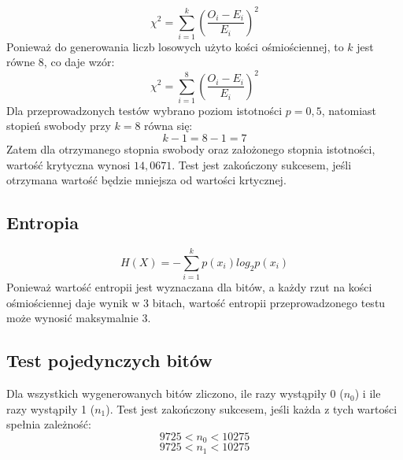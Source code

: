 \begin{displaymath}
    \chi^2 = \sum_{i=1}^{k} \left( \frac{O_i - E_i}{E_i} \right)^2
\end{displaymath}
Ponieważ do generowania liczb losowych użyto kości ośmiościennej, to \begin{math} k \end{math} jest równe 8, co daje wzór:
\begin{displaymath}
    \chi^2 = \sum^{8}_{i=1} \left( \frac{O_i - E_i}{E_i} \right)^2
\end{displaymath}
Dla przeprowadzonych testów wybrano poziom istotności \begin{math} p = 0,5 \end{math}, natomiast stopień swobody 
przy \begin{math} k = 8 \end{math} równa się:
\begin{displaymath}
    k - 1 = 8 - 1 = 7
\end{displaymath}
Zatem dla otrzymanego stopnia swobody oraz założonego stopnia istotności, wartość krytyczna wynosi \begin{math} 14,0671 \end{math}.
Test jest zakończony sukcesem, jeśli otrzymana wartość będzie mniejsza od wartości krtycznej.

\subsection{Entropia}
\begin{displaymath}
    H \left(X\right) = -\sum^k_{i=1} p \left(x_i\right) log_2 p \left(x_i\right)
\end{displaymath}
Ponieważ wartość entropii jest wyznaczana dla bitów, a każdy rzut na kości ośmiościennej daje wynik w 3 bitach, 
wartość entropii przeprowadzonego testu może wynosić maksymalnie 3.

\subsection{Test pojedynczych bitów}
Dla wszystkich wygenerowanych bitów zliczono, ile razy wystąpiły 0 (\begin{math}n_0\end{math}) i ile razy wystąpiły 1 
(\begin{math}n_1\end{math}). Test jest zakończony sukcesem, jeśli każda z tych wartości spełnia zależność:
\begin{displaymath}
    9725 < n_0 < 10275
\end{displaymath}
\begin{displaymath}
    9725 < n_1 < 10275
\end{displaymath}

